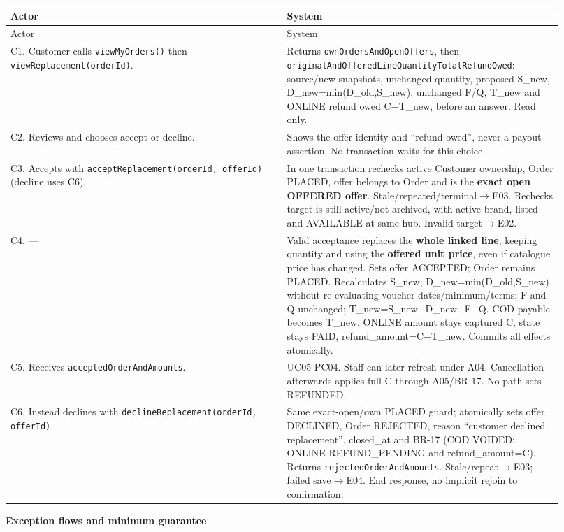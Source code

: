 \begin{longtable}{>{\raggedright\arraybackslash}p{0.4600\linewidth}>{\raggedright\arraybackslash}p{0.4600\linewidth}}
Actor & System \\
\hline\endfirsthead
Actor & System \\
\hline\endhead
C1. Customer calls \texttt{viewMyOrders()} then \texttt{viewReplacement(orderId)}. & Returns \texttt{ownOrdersAndOpenOffers}, then \texttt{originalAndOfferedLineQuantityTotalRefundOwed}: source/new snapshots, unchanged quantity, proposed S\_new, D\_new=min(D\_old,S\_new), unchanged F/Q, T\_new and ONLINE refund owed C\ensuremath{-}T\_new, before an answer. Read only. \\
C2. Reviews and chooses accept or decline. & Shows the offer identity and ``refund owed'', never a payout assertion. No transaction waits for this choice. \\
C3. Accepts with \texttt{acceptReplacement(orderId, offerId)} (decline uses C6). & In one transaction rechecks active Customer ownership, Order PLACED, offer belongs to Order and is the \textbf{exact open OFFERED offer}. Stale/repeated/terminal\ensuremath{\rightarrow}E03. Rechecks target is still active/not archived, with active brand, listed and AVAILABLE at same hub. Invalid target\ensuremath{\rightarrow}E02. \\
C4. --- & Valid acceptance replaces the \textbf{whole linked line}, keeping quantity and using the \textbf{offered unit price}, even if catalogue price has changed. Sets offer ACCEPTED; Order remains PLACED. Recalculates S\_new; D\_new=min(D\_old,S\_new) without re-evaluating voucher dates/minimum/terms; F and Q unchanged; T\_new=S\_new\ensuremath{-}D\_new+F\ensuremath{-}Q. COD payable becomes T\_new. ONLINE amount stays captured C, state stays PAID, refund\_amount=C\ensuremath{-}T\_new. Commits all effects atomically. \\
C5. Receives \texttt{acceptedOrderAndAmounts}. & UC05-PC04. Staff can later refresh under A04. Cancellation afterwards applies full C through A05/BR-17. No path sets REFUNDED. \\
C6. Instead declines with \texttt{declineReplacement(orderId, offerId)}. & Same exact-open/own PLACED guard; atomically sets offer DECLINED, Order REJECTED, reason ``customer declined replacement'', closed\_at and BR-17 (COD VOIDED; ONLINE REFUND\_PENDING and refund\_amount=C). Returns \texttt{rejectedOrderAndAmounts}. Stale/repeat\ensuremath{\rightarrow}E03; failed save\ensuremath{\rightarrow}E04. End response, no implicit rejoin to confirmation. \\
\end{longtable}
\textbf{Exception flows and minimum guarantee}

